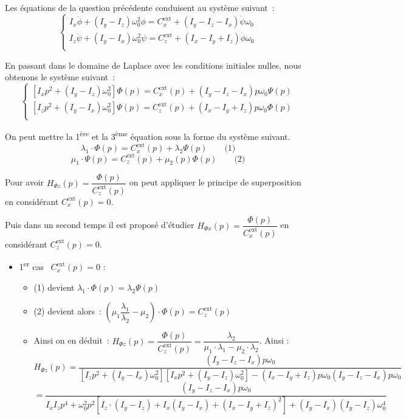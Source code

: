 \ifprof
\begin{corrige}

Les équations de la question précédente conduisent au système suivant~:
$$
\left\{
\begin{array}{c}
I_x\ddot{\phi} +\left(I_y-I_z\right)\omega_0^2\phi=C_x^{\text{ext}}+\left(I_y-I_z-I_x\right)\dot{\psi}\omega_0\\
I_z\ddot{\psi} +\left(I_y-I_x\right)\omega_0^2\psi=C_z^{\text{ext}}+\left(I_x-I_y+I_z\right)\dot{\phi}\omega_0\\
\end{array}
\right.
$$

En passant dans le domaine de Laplace avec les conditions initiales nulles, nous obtenons le système suivant~:
$$
\left\{
\begin{array}{c}
\left[I_x p^2+ \left(I_y-I_z\right)\omega_0^2\right]\Phi(p)=C_x^{\text{ext}}(p)+\left(I_y-I_z-I_x\right)p \omega_0\Psi(p)\\
\left[I_z p^2 +\left(I_y-I_x\right)\omega_0^2\right]\Psi(p)=C_z^{\text{ext}}(p)+\left(I_x-I_y+I_z\right)p\omega_0 \Phi(p)\\
\end{array}
\right.
$$

On peut mettre la 1\textsuperscript{ère} et la 3\textsuperscript{ème} équation sous la forme du système suivant.
$$ \lambda_1\cdot \Phi(p)=C_x^{\text{ext}}(p)+\lambda_2\Psi(p) \quad \quad \text{(1)} $$
$$ \mu_1 \cdot \Psi(p)=C_z^{\text{ext}}(p)+\mu_2(p) \Phi(p) \quad \quad \text{(2)} $$

Pour avoir $H_{\Phi z}(p)=\dfrac{\Phi(p)}{C_z^{\text{ext}}(p)}$ on peut appliquer le principe de superposition en
considérant $C_x^{\text{ext}}(p)=0$. 

Puis dans un second temps il est proposé d'étudier $H_{\Phi x}(p)=\dfrac{\Phi(p)}{C_x^{\text{ext}}(p)}$ en
considérant $C_z^{\text{ext}}(p)=0$.

\begin{itemize}
\item 1\textsuperscript{er} cas~  $C_x^{\text{ext}}(p)=0$ : 
  \begin{itemize}
  \item (1) devient $\lambda_1\cdot \Phi(p)=\lambda_2\Psi(p)$
  \item (2) devient alors~: $\left(\mu_1 \dfrac{\lambda_1}{\lambda_2}-\mu_2\right) \cdot \Phi(p)=C_z^{\text{ext}}(p)$
  \item Ainsi on en déduit~: $
H_{\Phi z}(p)=\dfrac{\Phi(p)}{C_z^{\text{ext}}(p)}=\dfrac{\lambda_2}{\mu_1\cdot \lambda_1-\mu_2\cdot \lambda_2}
$.
 Ainsi : 
$$
H_{\Phi z}(p)=\dfrac{\left(I_y-I_z-I_x\right)p\omega_0}{\left[I_z p^2 +\left(I_y-I_x\right)\omega_0^2\right]\left[I_x p^2+ \left(I_y-I_z\right)\omega_0^2\right]-\left(I_x-I_y+I_z\right)p\omega_0\left(I_y-I_z-I_x\right)p \omega_0}
$$
$$
=\dfrac{\left(I_y-I_z-I_x\right)p\omega_0}{I_xI_zp^4+\omega_0^2 p^2\left[I_z\cdot \left(I_y-I_z\right)+I_x\left(I_y-I_x\right)+\left(I_x-I_y+I_z\right)^2\right]+\left(I_y-I_x\right)\left(I_y-I_z\right)\omega_0^4}
$$
  

\end{itemize}
\end{itemize}
\end{corrige}
